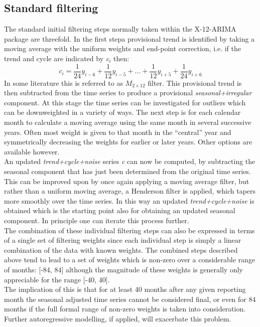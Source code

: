 \documentclass[english,blauw]{cbsdiscussionpaper}
\begin{document}
 \subsection*{Standard filtering}
The standard initial filtering steps normally taken within the X-12-ARIMA package are threefold. In the first stepa provisional trend is identified by taking a moving average with the uniform weights and end-point correction, i.e. if the trend and cycle are indicated by \textit{c$_i$} then:
\begin{equation*}
c_i=\frac{1}{24}y_{i-6}+\frac{1}{12}y_{i-5}+...+\frac{1}{12}y_{i+5}+\frac{1}{24}y_{i+6}
\end{equation*}
In some literature this is referred to as $M_{2\times12}$ filter. This provisional trend is then subtracted from the time series to produce a provisional \textit{seasonal+irregular} component. At this stage the time series can be investigated for outliers which can be downweighted in a variety of ways. The next step is for each calendar month to calculate a moving average using the same month in several successive years. Often most weight is given to that month in the ``central'' year and symmetrically decreasing the weights for earlier or later years. Other options are available however.\\An updated \textit{trend+cycle+noise} series \textit{c} can now be computed, by subtracting the seasonal component that has just been determined from the original time series. This can be improved upon by once again applying a moving average filter, but rather than a uniform moving average, a Henderson filter is applied, which tapers more smoothly over the time series. In this way an updated \textit{trend+cycle+noise} is obtained which is the starting point also for obtaining an updated seasonal component. In principle one can iterate this process further.\\The combination of these individual filtering steps can also be expressed in terms of a single set of filtering weights since each individual step is simply a linear combination of the data with known weights. The combined steps described above tend to lead to a set of weights which is non-zero over a considerable range of months: [-84, 84] although the magnitude of these weights is generally only appreciable for the range [-40, 40].\\The implication of this is that for at least 40 months after any given reporting month the seasonal adjusted time series cannot be considered final, or even for 84 months if the full formal range of non-zero weights is taken into consideration. Further autoregressive modelling, if applied, will exacerbate this problem.
\end{document}
